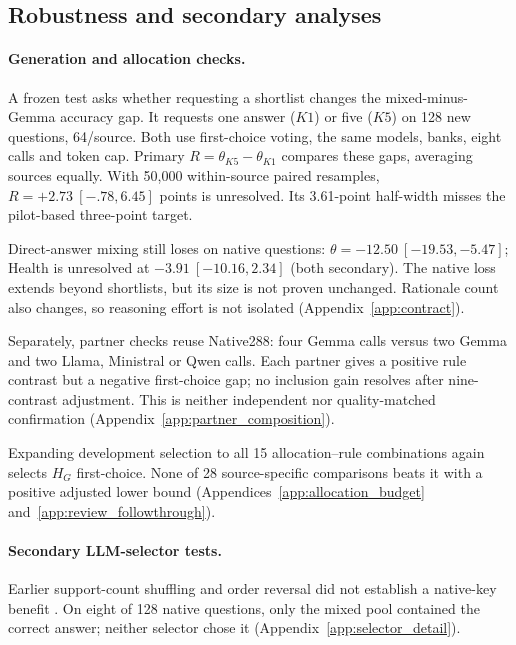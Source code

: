 \documentclass{article}
\begin{document}
\subsection{Robustness and secondary analyses}

\paragraph{Generation and allocation checks.}
A frozen test asks whether requesting a shortlist changes the mixed-minus-Gemma accuracy gap. It requests one answer ($K1$) or five ($K5$) on 128 new questions, 64/source. Both use first-choice voting, the same models, banks, eight calls and token cap. Primary $R=\theta_{K5}-\theta_{K1}$ compares these gaps, averaging sources equally. With 50,000 within-source paired resamples, $R=+2.73\ [-.78,6.45]$ points is unresolved. Its 3.61-point half-width misses the pilot-based three-point target.

Direct-answer mixing still loses on native questions: $\theta=-12.50\ [-19.53,-5.47]$; Health is unresolved at $-3.91\ [-10.16,2.34]$ (both secondary). The native loss extends beyond shortlists, but its size is not proven unchanged. Rationale count also changes, so reasoning effort is not isolated (Appendix~\ref{app:contract}).


Separately, partner checks reuse Native288: four Gemma calls versus two Gemma and two Llama, Ministral or Qwen calls. Each partner gives a positive rule contrast but a negative first-choice gap; no inclusion gain resolves after nine-contrast adjustment. This is neither independent nor quality-matched confirmation (Appendix~\ref{app:partner_composition}).

Expanding development selection to all 15 allocation--rule combinations again selects $H_G$ first-choice. None of 28 source-specific comparisons beats it with a positive adjusted lower bound (Appendices~\ref{app:allocation_budget} and~\ref{app:review_followthrough}).







\paragraph{Secondary LLM-selector tests.}\label{sec:support_boundaries}

Earlier support-count shuffling and order reversal did not establish a native-key benefit \citep{chen2026routinggap}. On eight of 128 native questions, only the mixed pool contained the correct answer; neither selector chose it (Appendix~\ref{app:selector_detail}).
\end{document}

